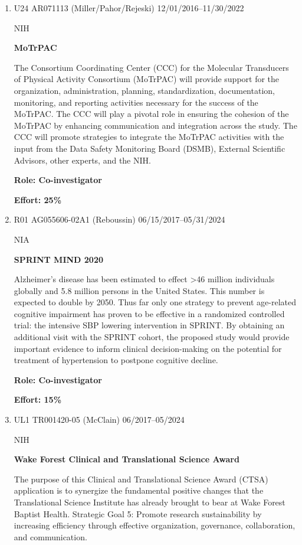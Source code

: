 \documentclass[11pt]{cv_wakeforest_article}
\newcommand{\AR}[1]{#1}  %
\begin{document}
\begin{enumerate}

\item \AR{U24 AR071113 (Miller/Pahor/Rejeski)} \hfill 12/01/2016--11/30/2022 

NIH

{\bfseries MoTrPAC}

The Consortium Coordinating Center (CCC) for the Molecular Transducers of Physical Activity Consortium (MoTrPAC) will provide support for the organization, administration, planning, standardization, documentation, monitoring, and reporting activities necessary for the success of the MoTrPAC. The CCC will play a pivotal role in ensuring the cohesion of the MoTrPAC by enhancing communication and integration across the study. The CCC will promote strategies to integrate the MoTrPAC activities with the input from the Data Safety Monitoring Board (DSMB), External Scientific Advisors, other experts, and the NIH.

{\bfseries Role: Co-investigator}

{\bfseries Effort: 25\%}

\item \AR{R01 AG055606-02A1 (Reboussin)} \hfill 06/15/2017--05/31/2024
  
NIA

{\bfseries SPRINT MIND 2020}

Alzheimer’s disease has been estimated to effect >46 million individuals globally and 5.8 million persons in the United States. This number is expected to double by 2050.  Thus far only one strategy to prevent age-related cognitive impairment has proven to be effective in a randomized controlled trial: the intensive SBP lowering intervention in SPRINT.  By obtaining an additional visit with the SPRINT cohort, the proposed study would provide important evidence to inform clinical decision-making on the potential for treatment of hypertension to postpone cognitive decline. 

{\bfseries Role: Co-investigator}

{\bfseries Effort: 15\%}

  
\item \AR{UL1 TR001420-05 (McClain)} \hfill 06/2017--05/2024 

NIH

{\bfseries Wake Forest Clinical and Translational Science Award}

The purpose of this Clinical and Translational Science Award (CTSA) application is to synergize the fundamental positive changes that the Translational Science Institute has already brought to bear at Wake Forest Baptist Health. Strategic Goal 5: Promote research sustainability by increasing efficiency through effective organization, governance, collaboration, and communication. 


\end{enumerate}
\end{document}
